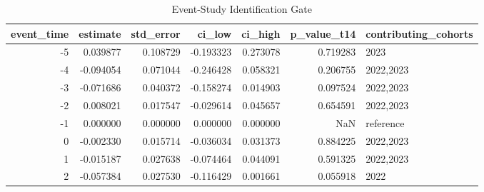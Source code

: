 \begin{table}
\caption{Event-Study Identification Gate}
\label{tab:table2_event_study_gate}
\begin{tabular}{rrrrrrl}
\toprule
event_time & estimate & std_error & ci_low & ci_high & p_value_t14 & contributing_cohorts \\
\midrule
-5 & 0.039877 & 0.108729 & -0.193323 & 0.273078 & 0.719283 & 2023 \\
-4 & -0.094054 & 0.071044 & -0.246428 & 0.058321 & 0.206755 & 2022,2023 \\
-3 & -0.071686 & 0.040372 & -0.158274 & 0.014903 & 0.097524 & 2022,2023 \\
-2 & 0.008021 & 0.017547 & -0.029614 & 0.045657 & 0.654591 & 2022,2023 \\
-1 & 0.000000 & 0.000000 & 0.000000 & 0.000000 & NaN & reference \\
0 & -0.002330 & 0.015714 & -0.036034 & 0.031373 & 0.884225 & 2022,2023 \\
1 & -0.015187 & 0.027638 & -0.074464 & 0.044091 & 0.591325 & 2022,2023 \\
2 & -0.057384 & 0.027530 & -0.116429 & 0.001661 & 0.055918 & 2022 \\
\bottomrule
\end{tabular}
\end{table}
